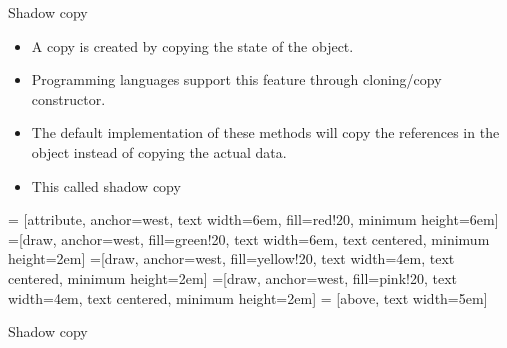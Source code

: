 \documentclass[13pt]{beamer}
\begin{document}
\begin{frame}{Shadow copy}
\begin{itemize}
\setlength\itemsep{1em}

\item A copy is created by copying the state of the object.

\item Programming languages support this feature through cloning/copy constructor.

\item The default implementation of these methods will copy the references in the object instead of copying the actual data.

\item This called shadow copy

\end{itemize}
\end{frame}

 = [attribute, anchor=west, text width=6em, fill=red!20, minimum height=6em]
=[draw, anchor=west, fill=green!20, text width=6em, text centered, minimum height=2em]
=[draw, anchor=west, fill=yellow!20, text width=4em, text centered, minimum height=2em]
=[draw, anchor=west, fill=pink!20, text width=4em, text centered, minimum height=2em]
 = [above, text width=5em]

\begin{frame}{Shadow copy}
\end{frame}
\end{document}
